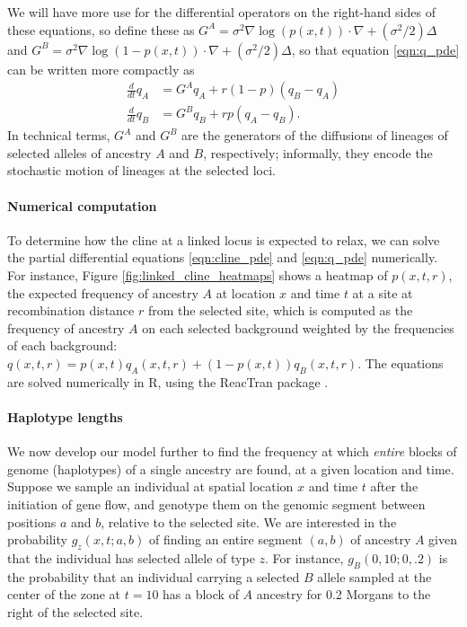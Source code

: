 \documentclass[11pt,letterpaper]{article}
\newcommand{\alisa}[1]{{\em \color{red} #1}}
\newcommand{\plr}[1]{{\em \color{blue} #1}}
\newcommand{\grad}{\nabla}
\begin{document}
We will have more use for the differential operators on the right-hand sides of these equations,
so define these as
$G^A = \sigma^2 \grad \log(p(x,t)) \cdot \grad + (\sigma^2/2) \Delta$
and
$G^B = \sigma^2 \grad \log(1-p(x,t)) \cdot \grad + (\sigma^2/2) \Delta$,
so that equation \eqref{eqn:q_pde} can be written more compactly as
\begin{align*}
    \frac{d}{dt} q_A &= G^A q_A + r (1-p) (q_B-q_A) \\
    \frac{d}{dt} q_B &= G^B q_B + r p (q_A-q_B) .
\end{align*}
In technical terms, $G^A$ and $G^B$ are the generators of the diffusions of lineages of selected alleles of ancestry $A$ and $B$, respectively;
informally, they encode the stochastic motion of lineages at the selected loci.


\paragraph{Numerical computation}
To determine how the cline at a linked locus is expected to relax, 
we can solve the partial differential equations \eqref{eqn:cline_pde} and \eqref{eqn:q_pde} numerically.
For instance, Figure \ref{fig:linked_cline_heatmaps} shows a heatmap of $p(x,t,r)$, 
the expected frequency of ancestry $A$ at location $x$ and time $t$ 
at a site at recombination distance $r$ from the selected site,
which is computed as the frequency of ancestry $A$ on each selected background weighted by the frequencies of each background:
$q(x,t,r) = p(x,t) q_A(x,t,r) + (1-p(x,t)) q_B(x,t,r)$. 
The equations are solved numerically in R, using the ReacTran package \citep{soetaert2012reactive}.

\paragraph{Haplotype lengths}
We now develop our model further to find the frequency at which \emph{entire} blocks of genome (haplotypes) 
of a single ancestry are found, at a given location and time.
Suppose we sample an individual at spatial location $x$ and time $t$ after the initiation of gene flow,
and genotype them on the genomic segment between positions $a$ and $b$, relative to the selected site. 
We are interested in the probability $g_z(x,t;a,b)$ 
of finding an entire segment $(a,b)$ of ancestry $A$ 
given that the individual has selected allele of type $z$.
For instance, $g_B(0,10;0,.2)$ is the probability that an individual carrying a selected $B$ allele sampled at the center of the zone
at $t=10$ has a block of $A$ ancestry for 0.2 Morgans to the right of the selected site.
\end{document}
